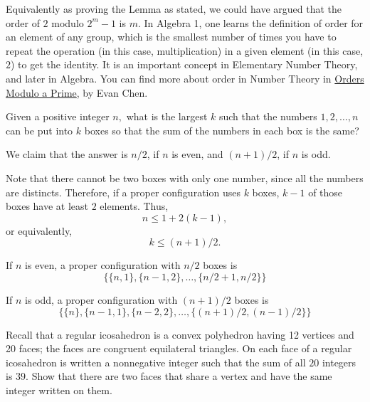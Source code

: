 \begin{com}
	Equivalently as proving the Lemma as stated, we could have argued that the order of \(2\) modulo \(2^m - 1\) is \(m\). In Algebra 1, one learns the definition of order for an element of any group,  which is the smallest number of times you have to repeat the operation (in this case, multiplication) in a given element (in this case, \(2\)) to get the identity. It is an important concept in Elementary Number Theory, and later in Algebra. You can find more about order in Number Theory in \href{https://web.evanchen.cc/handouts/ORPR/ORPR.pdf}{Orders Modulo a Prime}, by Evan Chen.
\end{com}

\newpage
\begin{prob}[Putnam 2010, A1]
Given a positive integer $n,$ what is the largest $k$ such that the numbers $1,2,\dots,n$ can be put into $k$ boxes so that the sum of the numbers in each box is the same?
\end{prob}

\begin{sol}
	We claim that the answer is \(n/2\), if \(n\) is even, and \((n+1)/2\), if \(n\) is odd.

	Note that there cannot be two boxes with only one number, since all the numbers are distincts. Therefore, if a proper configuration uses \(k\) boxes, \(k - 1\) of those boxes have at least \(2\) elements. Thus, \[
		n \leq 1 + 2(k-1),
	\]
	or equivalently, \[
		k \leq (n + 1)/2.
	\]

	If \(n\) is even, a proper configuration with \(n/2\) boxes is \[
		\{\{n, 1\}, \{n - 1, 2\}, \dots, \{n/2 + 1, n/2\}\}
	\]

	If \(n\) is odd, a proper configuration with \((n+1)/2\) boxes is \[
		\{\{n\}, \{n-1, 1\}, \{n - 2, 2\}, \dots, \{(n+1)/2, (n-1)/2\}\}
	\]
	
\end{sol}

\newpage
\begin{prob}[Putnam 2013, A1]
Recall that a regular icosahedron is a convex polyhedron having 12 vertices and 20 faces; the faces are congruent equilateral triangles. On each face of a regular icosahedron is written a nonnegative integer such that the sum of all $20$ integers is $39.$ Show that there are two faces that share a vertex and have the same integer written on them.
\end{prob}

